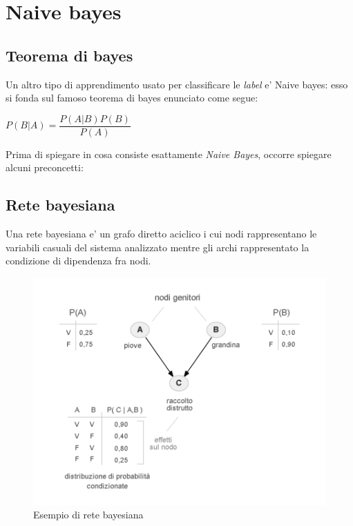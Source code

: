 \newpage
\section*{Naive bayes}
\subsection*{Teorema di bayes}
Un altro tipo di apprendimento usato per classificare le \textit{label} e' Naive bayes: esso si fonda sul famoso teorema di bayes enunciato come segue:
\begin{center}
	$P(B|A) = \dfrac{P(A|B)P(B)}{P(A)}$
\end{center}
Prima di spiegare in cosa consiste esattamente \textit{Naive Bayes}, occorre spiegare alcuni preconcetti:
\subsection*{Rete bayesiana}
Una rete bayesiana e' un grafo diretto aciclico i cui nodi rappresentano le variabili casuali del sistema analizzato mentre gli archi rappresentato la condizione di dipendenza fra nodi.
\begin{figure}[h]
	\centering
	\includegraphics[width=0.7\linewidth]{img/rete-bayesiana-grafo.png}
	\caption{Esempio di rete bayesiana}
	\label{fig:rete-bayesiana-grafo}
\end{figure}





